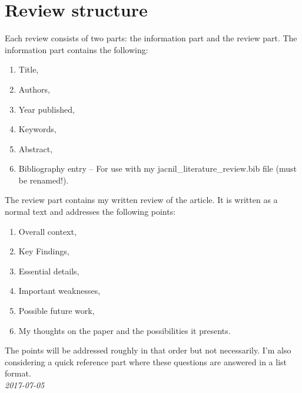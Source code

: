 \documentclass[10pt]{article}
\begin{document}
\begin{minipage}[p]{0.75\textwidth}
\section*{\LARGE Review structure}
    Each review consists of two parts: the information part and the review part.
    The information part contains the following:
    \begin{enumerate}
        \item Title,
        \item Authors,
        \item Year published,
        \item Keywords,
        \item Abstract,
        \item Bibliography entry -- For use with my jacnil\_literature\_review.bib file (must be renamed!).
    \end{enumerate}
    The review part contains my written review of the article.
    It is written as a normal text and addresses the following points:
    \begin{enumerate}
        \item Overall context,
        \item Key Findings,
        \item Essential details,
        \item Important weaknesses,
        \item Possible future work,
        \item My thoughts on the paper and the possibilities it presents.
    \end{enumerate}
    The points will be addressed roughly in that order but not necessarily.
    I'm also considering a quick reference part where these questions are answered in a list format.    
    \vspace{0.3cm}\\
    \-\phantom{OO}\textit{2017-07-05}
\end{minipage}
\newpage
\flushleft
\end{document}
